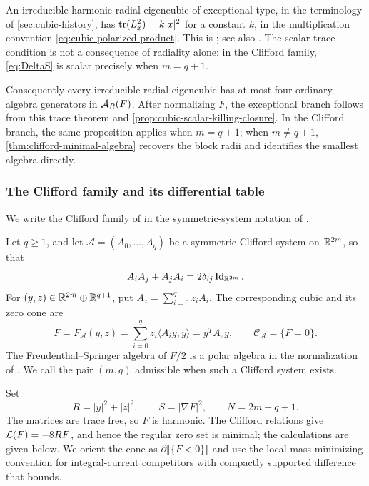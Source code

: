 \begin{remark}
\label{rem:cubic-harmonic-generator-bound}
An irreducible harmonic radial eigencubic of exceptional type,
in the terminology of \cref{sec:cubic-history}, has \(\operatorname{tr}(L_x^2)=k|x|^2\)
for a constant \(k\), in the multiplication convention
\eqref{eq:cubic-polarized-product}. This is
\cite[Proposition~6.11.1]{NadirashviliTkachevVladut14}; see also
\cite[Proposition~5.2, equation~(5.11)]{TkachevClassification10}.
The scalar trace condition is not a consequence of radiality alone:
in the Clifford family, \eqref{eq:DeltaS} is scalar precisely when
\(m=q+1\).

Consequently every irreducible radial eigencubic has at most four
ordinary algebra generators in \(\mathcal A_R(F)\). After normalizing
\(F\), the exceptional branch follows from this trace theorem and
\cref{prop:cubic-scalar-killing-closure}. In the Clifford branch,
the same proposition applies when \(m=q+1\); when
\(m\ne q+1\), \cref{thm:clifford-minimal-algebra} recovers the
block radii and identifies the smallest algebra directly.
\end{remark}


\subsubsection{The Clifford family and its differential table}
\label{sec:invariants}
We write the Clifford family of
\cite[Theorem~B]{PengXiao93} in the symmetric-system notation of
\cite{TkachevClifford10}.

Let \(q\geq1\), and let
\(\mathcal A=(A_0,\ldots,A_q)\) be a symmetric Clifford system on
\(\mathbb R^{2m}\), so that
\begin{equation}\label{eq:clifford-system}
 A_iA_j+A_jA_i=2\delta_{ij}\operatorname{Id}_{\mathbb R^{2m}}.
\end{equation}
For \((y,z)\in\mathbb R^{2m}\oplus\mathbb R^{q+1}\), put
\(A_z=\sum_{i=0}^qz_iA_i\).  The corresponding cubic and its zero cone are
\begin{equation}\label{eq:clifford-F}
 F=F_{\mathcal A}(y,z)=\sum_{i=0}^qz_i\langle A_i y,y\rangle
 =y^TA_zy,\qquad \mathcal C_{\mathcal A}=\{F=0\}.
\end{equation}
The Freudenthal--Springer algebra of \(F/2\) is a polar algebra in the
normalization of
\cite[Definition~6.5.1 and Propositions~6.5.1--6.5.2]{NadirashviliTkachevVladut14}.
We call the pair \((m,q)\) admissible when such a Clifford system exists.

Set
\[
 R=|y|^2+|z|^2,\qquad S=|\nabla F|^2,\qquad N=2m+q+1.
\]
The matrices are trace free, so \(F\) is harmonic.  The Clifford
relations give \(\mathcal L(F)=-8RF\), and hence the regular zero set is
minimal; the calculations are given below.
We orient the cone as \(\partial\llbracket\{F<0\}\rrbracket\)
and use the local mass-minimizing convention for integral-current
competitors with compactly supported difference that bounds.

